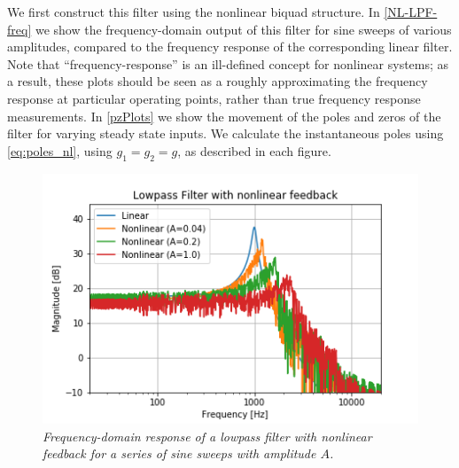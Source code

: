 \documentclass[twoside,a4paper]{article}
\begin{document}
We first construct this filter using the nonlinear biquad structure.
In \cref{NL-LPF-freq} we show the frequency-domain output of this filter
for sine sweeps of various amplitudes, compared to the frequency response
of the corresponding linear filter. Note that ``frequency-response'' is
an ill-defined concept for nonlinear systems; as a result, these plots
should be seen as a roughly approximating the frequency response at
particular operating points, rather than true frequency response measurements.
In \cref{pzPlots} we show the movement of the poles and zeros of the filter
for varying steady state inputs. We calculate the instantaneous poles using
\cref{eq:poles_nl}, using $g_1 = g_2 = g$, as described in each figure.
%
\begin{figure}[ht]
    \center
    \includegraphics[width=\linewidth]{../../NonlinearFeedback/Pics/LPF-NL.png}
    \caption{\label{NL2-LPF-freq}{\it Frequency-domain response of a lowpass filter
                                      with nonlinear feedback for a series of sine
                                      sweeps with amplitude $A$.}}
\end{figure}
%
\end{document}

